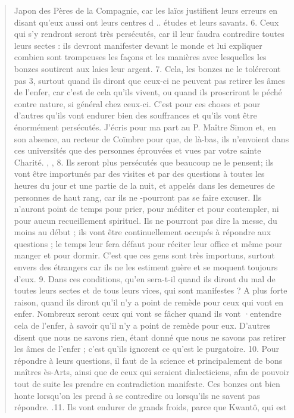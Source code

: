 \begin{quote}
    Japon des Pères de la Compagnie, car les laïcs justifient leurs
erreurs en disant qu'eux aussi ont leurs centres d .. études et leurs
savants.
6. Ceux qui s'y rendront seront très persécutés, car il leur faudra
contredire toutes leurs sectes : ils devront manifester devant le
monde et lui expliquer combien sont trompeuses les façons et les
manières avec lesquelles les bonzes soutirent aux laïcs leur argent.
7. Cela, les bonzes ne le toléreront pas 3, surtout quand ils
diront que ceux-ci ne peuvent pas retirer les âmes de l'enfer, car
c'est de cela qu'ils vivent, ou quand ils proscriront le péché contre
nature, si général chez ceux-ci. C'est pour ces choses et pour
d'autres qu'ils vont endurer bien des souffrances et qu'ils vont être
énormément persécutés. J'écris pour ma part au P. Maître Simon
et, en son absence, au recteur de Coïmbre pour que, de là-bas, ils
n'envoient dans ces universités que des personnes éprouvées et vues
par votre sainte Charité. ,
, 8. Ils seront plus persécutés que beaucoup ne le pensent; ils vont
être importunés par des visites et par des questions à toutes les heures
du jour et une partie de la nuit, et appelés dans les demeures
de personnes de haut rang, car ils ne -pourront pas se faire excuser.
Ils n'auront point de temps pour prier, pour méditer et pour
contempler, ni pour aucun recueillement spirituel. Ils ne pourront
pas dire la messe, du moins au début ; ils vont être continuellement
occupés à répondre aux questions ; le temps leur fera défaut pour
réciter leur office et même pour manger et pour dormir. C'est que
ces gens sont très importuns, surtout envers des étrangers car ils
ne les estiment guère et se moquent toujours d'eux.
9. Dans ces conditions, qu'en sera-t-il quand ils diront du mal
de toutes leurs sectes et de tous leurs vices, qui sont manifestes ?
A plus forte raison, quand ils diront qu'il n'y a point de remède
pour ceux qui vont en enfer. Nombreux seront ceux qui vont se
fâcher quand ils vont ·entendre cela de l'enfer, à savoir qu'il n'y
a point de remède pour eux. D'autres disent que nous ne savons
rien, étant donné que nous ne savons pas retirer les âmes de
l'enfer ; c'est qu'ils ignorent ce qu'est le purgatoire.
10. Pour répondre à leurs questions, il faut de la science et principalement
de bons maîtres ès-Arts, ainsi que de ceux qui seraient
dialecticiens, afm de pouvoir tout de suite les prendre en contradiction
manifeste. Ces bonzes ont bien honte lorsqu'on les prend
à se contredire ou lorsqu'ils ne savent pas répondre.
.11. Ils vont endurer de grands froids, parce que Kwantô, qui est
\end{quote}

